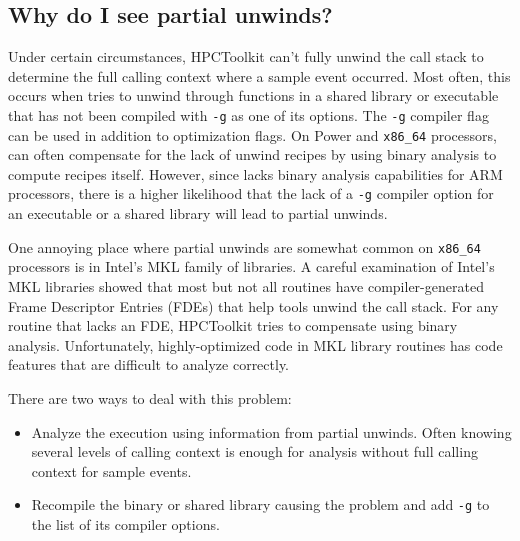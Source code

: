 \documentclass[11pt,twoside,letterpaper]{report}
\begin{document}

\subsection{Why do I see partial unwinds?}
\label{sec:partial}

Under certain circumstances, HPCToolkit can't fully unwind the call
stack to determine the full calling context where a sample event
occurred. Most often, this occurs when \hpcrun{} tries to unwind
through functions in a shared library or executable that has not
been compiled with \verb|-g| as one of its options. The \verb|-g|
compiler flag can be used in addition to optimization flags. On
Power and \verb|x86_64| processors, \hpcrun{} can often compensate
for the lack of unwind recipes by using
binary analysis to compute recipes itself. However, since \hpcrun{}
lacks binary analysis capabilities for ARM processors, there is a
higher likelihood that the lack of a \verb|-g| compiler option for
an executable or a shared library will lead to partial unwinds.

One annoying place where partial unwinds are somewhat common on \verb|x86_64|
processors is in Intel's MKL family of libraries.  A careful examination of Intel’s
MKL libraries showed that most but not all routines have
compiler-generated Frame Descriptor Entries (FDEs) that help tools
unwind the call stack.  For any routine that lacks
an FDE, HPCToolkit tries to compensate using binary analysis.
Unfortunately, highly-optimized code in MKL library
routines has code features that are difficult to analyze correctly.

There are two ways to deal with this problem:
\begin{itemize}
\item Analyze the execution using information from partial unwinds. Often knowing several levels of calling context is enough for analysis without full calling context for sample events.
\item
Recompile the binary or shared library causing the problem and add \verb|-g| to the list of its compiler options.
\end{itemize}

\end{document}

